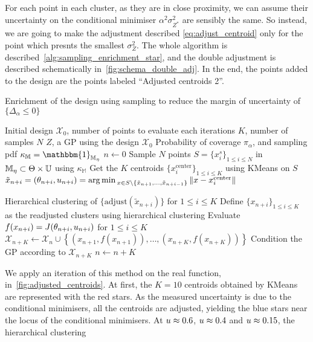 \documentclass[../../Main_ManuscritThese.tex]{subfiles}
\begin{document}
For each point in each cluster, as they are in close proximity, we can
assume their uncertainty on the conditional minimiser
$\alpha^2\sigma^2_{Z^*}$ are sensibly the same. So instead, we are
going to make the adjustment described \cref{eq:adjust_centroid} only
for the point which presnts the smallest $\sigma^2_Z$.  The whole
algorithm is described~\cref{alg:sampling_enrichment_star}, and the
double adjustment is described schematically
in~\cref{fig:schema_double_adj}. In the end, the points added to the
design are the points labeled ``Adjusted centroids 2''.



\begin{algorithm}
  \caption{Enrichment of the design using sampling to reduce the margin of uncertainty of $\{\Delta_{\alpha}\leq 0\}$}
  \label{alg:sampling_enrichment_star}
\begin{algorithmic}
  \REQUIRE Initial design $\mathcal{X}_0$, 
  \REQUIRE number of points to evaluate each iterations $K$, number of samples $N$
  \REQUIRE $Z$, a GP using the design $\mathcal{X}_0$
  \REQUIRE Probability of coverage $\pi_{\alpha}$, and sampling pdf $\kappa_{\mathbb{M}} = \mathbbm{1}_{\mathbb{M}_{\eta}}$
\STATE $n \leftarrow 0$
\STATE Sample $N$ points $S = \{x^s_i\}_{1 \leq i \leq N}$ in $\mathbb{M}_{\eta}\subset \Theta \times \mathbb{U}$ using $\kappa_{\mathbb{M}}$
\STATE Get the $K$ centroids $\{x_i^{\mathrm{center}}\}_{1 \leq i \leq K}$ using KMeans on $S$
\STATE $\tilde{x}_{n+i}=(\theta_{n+i},u_{n+i})=\operatorname*{arg\,min \,}_{x \in S \setminus \{\tilde{x}_{n+1}, \dots, \tilde{x}_{n+i-1}\}} \|x - x_i^{\mathrm{center}} \|$
\ENDFOR

\STATE Hierarchical clustering of $\{\mathrm{adjust}(\tilde{x}_{n+i})\}$ for $1 \leq i \leq K$
\STATE Define $\{x_{n+i}\}_{1\leq i\leq K}$ as the readjusted clusters using hierarchical clustering
\STATE Evaluate $f(x_{n+i})=J(\theta_{n+i},u_{n+i})$ for $1\leq i \leq K$
\STATE $\mathcal{X}_{n+K} \leftarrow \mathcal{X}_n \cup \left\{\left(x_{n+1}, f(x_{n+1})\right),\dots,  \left(x_{n+K}, f(x_{n+K})\right)\right\}$
\STATE Condition the GP according to $\mathcal{X}_{n+K}$
\STATE $n \leftarrow n + K$
\ENDWHILE
\end{algorithmic}
\end{algorithm}

We apply an iteration of this method on the real function,
in~\cref{fig:adjusted_centroids}. At first, the $K=10$ centroids
obtained by KMeans are represented with the red stars. As the measured
uncertainty is due to the conditional minimisers, all the centroids
are adjusted, yielding the blue stars near the locus of the conditional minimisers. At
$u \approx \num{0.6}$, $u\approx\num{0.4}$ and $u\approx \num{0.15}$, the hierarchical clustering
\end{document}
